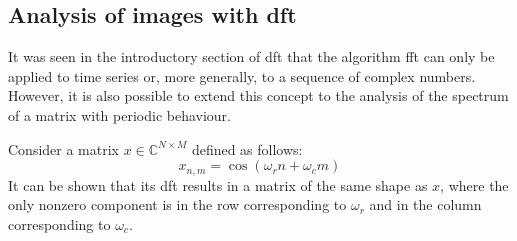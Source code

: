 \subsection{Analysis of images with \gls{dft}}
It was seen in the introductory section of \gls{dft} that the algorithm \gls{fft} can only be applied to time series or, more generally, to a sequence of complex numbers. However, it is also possible to extend this concept to the analysis of the spectrum of a matrix with periodic behaviour.

\noindent Consider a matrix $x \in \mathbb{C}^{N \times M}$ defined as follows:
\[
x_{n,m} = \cos\left(\omega_rn+\omega_cm\right)
\]
It can be shown that its \gls{dft} results in a matrix of the same shape as $x$, where the only nonzero component is in the row corresponding to $\omega_r$ and in the column corresponding to $\omega_c$.

